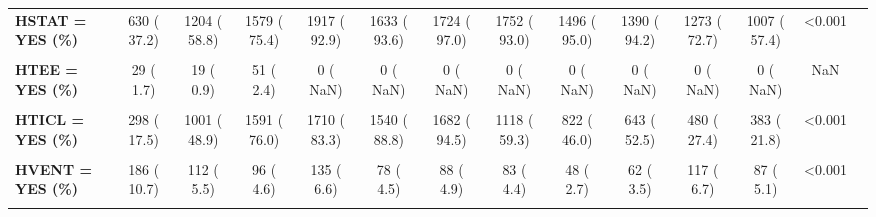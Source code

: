 \documentclass[
]{article}
\begin{document}
\begin{table}[H]
\begin{tabular}[t]{>{\raggedright\arraybackslash}p{5em}ccccccccccccc}
\textbf{HSTAT = YES (\%)} & 630 ( 37.2) & 1204 ( 58.8) & 1579 ( 75.4) & 1917 ( 92.9) & 1633 ( 93.6) & 1724 ( 97.0) & 1752 ( 93.0) & 1496 ( 95.0) & 1390 ( 94.2) & 1273 ( 72.7) & 1007 ( 57.4) & <0.001 & \\
\textbf{\cellcolor{gray!10}{HSTRES = YES (\%)}} & \cellcolor{gray!10}{0 (  NaN)} & \cellcolor{gray!10}{0 (  NaN)} & \cellcolor{gray!10}{0 (  NaN)} & \cellcolor{gray!10}{0 (  NaN)} & \cellcolor{gray!10}{34 (  2.0)} & \cellcolor{gray!10}{39 (  2.2)} & \cellcolor{gray!10}{38 (  2.0)} & \cellcolor{gray!10}{28 (  1.6)} & \cellcolor{gray!10}{20 (  1.1)} & \cellcolor{gray!10}{6 (  0.3)} & \cellcolor{gray!10}{6 (  0.3)} & \cellcolor{gray!10}{NaN} & \cellcolor{gray!10}{}\\
\textbf{HTEE = YES (\%)} & 29 (  1.7) & 19 (  0.9) & 51 (  2.4) & 0 (  NaN) & 0 (  NaN) & 0 (  NaN) & 0 (  NaN) & 0 (  NaN) & 0 (  NaN) & 0 (  NaN) & 0 (  NaN) & NaN & \\
\textbf{\cellcolor{gray!10}{HTICGR = YES (\%)}} & \cellcolor{gray!10}{0 (  NaN)} & \cellcolor{gray!10}{0 (  NaN)} & \cellcolor{gray!10}{0 (  NaN)} & \cellcolor{gray!10}{0 (  NaN)} & \cellcolor{gray!10}{0 (  NaN)} & \cellcolor{gray!10}{5 (  0.3)} & \cellcolor{gray!10}{375 ( 19.9)} & \cellcolor{gray!10}{640 ( 35.8)} & \cellcolor{gray!10}{782 ( 61.7)} & \cellcolor{gray!10}{622 ( 35.5)} & \cellcolor{gray!10}{380 ( 21.7)} & \cellcolor{gray!10}{NaN} & \cellcolor{gray!10}{}\\
\textbf{HTICL = YES (\%)} & 298 ( 17.5) & 1001 ( 48.9) & 1591 ( 76.0) & 1710 ( 83.3) & 1540 ( 88.8) & 1682 ( 94.5) & 1118 ( 59.3) & 822 ( 46.0) & 643 ( 52.5) & 480 ( 27.4) & 383 ( 21.8) & <0.001 & \\
\textbf{\cellcolor{gray!10}{HTPM = YES (\%)}} & \cellcolor{gray!10}{68 (  3.9)} & \cellcolor{gray!10}{45 (  2.2)} & \cellcolor{gray!10}{55 (  2.6)} & \cellcolor{gray!10}{49 (  2.4)} & \cellcolor{gray!10}{43 (  2.5)} & \cellcolor{gray!10}{30 (  1.7)} & \cellcolor{gray!10}{26 (  1.4)} & \cellcolor{gray!10}{21 (  1.2)} & \cellcolor{gray!10}{17 (  1.0)} & \cellcolor{gray!10}{15 (  0.9)} & \cellcolor{gray!10}{14 (  0.8)} & \cellcolor{gray!10}{<0.001} & \cellcolor{gray!10}{}\\
\textbf{HVENT = YES (\%)} & 186 ( 10.7) & 112 (  5.5) & 96 (  4.6) & 135 (  6.6) & 78 (  4.5) & 88 (  4.9) & 83 (  4.4) & 48 (  2.7) & 62 (  3.5) & 117 (  6.7) & 87 (  5.1) & <0.001 & \\
\textbf{\cellcolor{gray!10}{Hypoglyc\_other\_Chron = YES (\%)}} & \cellcolor{gray!10}{0 (  NaN)} & \cellcolor{gray!10}{0 (  NaN)} & \cellcolor{gray!10}{0 (  NaN)} & \cellcolor{gray!10}{0 (  NaN)} & \cellcolor{gray!10}{0 (  NaN)} & \cellcolor{gray!10}{0 (  NaN)} & \cellcolor{gray!10}{0 (  NaN)} & \cellcolor{gray!10}{52 (  8.4)} & \cellcolor{gray!10}{40 (  7.4)} & \cellcolor{gray!10}{21 (  2.8)} & \cellcolor{gray!10}{19 (  2.5)} & \cellcolor{gray!10}{NaN} & \cellcolor{gray!10}{}\\

\end{tabular}
\end{table}
\end{document}
